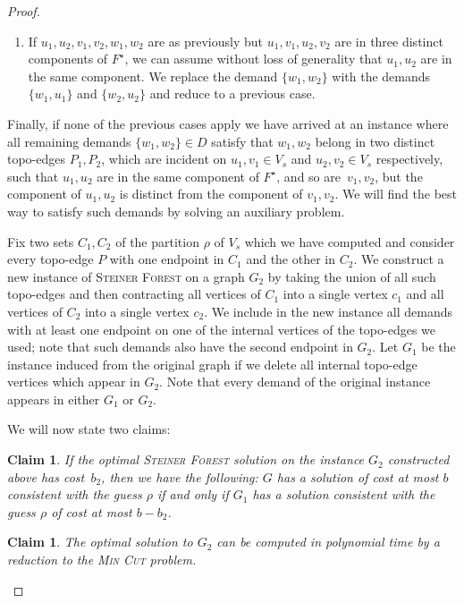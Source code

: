 \documentclass[a4paper]{article}
\theoremstyle{plain}
\newtheorem{claim}[theorem]{Claim}%
\newcommand{\pname}[1]{\textsc{#1}}
\newcommand{\SF}{\pname{Steiner Forest}\xspace}
\begin{document}
\begin{proof}
\begin{enumerate}
\item If $u_1,u_2,v_1,v_2,w_1,w_2$ are as previously but $u_1,v_1,u_2,v_2$ are
in three distinct components of $F^\star$, we can assume without loss of
generality that $u_1,u_2$ are in the same component. We replace the demand
$\{w_1,w_2\}$ with the demands $\{w_1,u_1\}$ and $\{w_2,u_2\}$ and reduce to a
previous case.

\end{enumerate}

Finally, if none of the previous cases apply we have arrived at an instance
where all remaining demands $\{w_1,w_2\}\in D$ satisfy that $w_1,w_2$
belong in two distinct topo-edges $P_1,P_2$, which are incident on $u_1,v_1\in
V_s$ and $u_2,v_2\in V_s$ respectively, such that $u_1,u_2$ are in the same
component of $F^\star$, and so are~$v_1,v_2$, but the component of $u_1,u_2$ is
distinct from the component of $v_1,v_2$.  We will find the best way to satisfy
such demands by solving an auxiliary problem.

Fix two sets $C_1,C_2$ of the partition $\rho$ of $V_s$ which we have computed
and consider every topo-edge $P$ with one endpoint in $C_1$ and the other in
$C_2$. We construct a new instance of \SF on a graph $G_2$ by taking the union
of all such topo-edges and then contracting all vertices of $C_1$ into a single
vertex $c_1$ and all vertices of $C_2$ into a single vertex $c_2$. We include
in the new instance all demands with at least one endpoint on one of the
internal vertices of the topo-edges we used; note that such demands also have
the second endpoint in $G_2$. Let $G_1$ be the instance induced from the
original graph if we delete all internal topo-edge vertices which appear in
$G_2$. Note that every demand of the original instance appears in either $G_1$
or $G_2$.

We will now state two claims:

\begin{claim}\label{claim:g1g2} %
If the optimal \SF solution on the
instance $G_2$ constructed above has cost~$b_2$, then we have the following:
$G$ has a solution of cost at most $b$ consistent with the guess $\rho$ if and
only if $G_1$ has a solution consistent with the guess $\rho$ of cost at most
$b-b_2$.  \end{claim}

\begin{claim}\label{claim:g2opt} %
The optimal solution to $G_2$ can be
computed in polynomial time by a reduction to the \textsc{Min Cut} problem.
\end{claim}


\end{proof}
\end{document}

